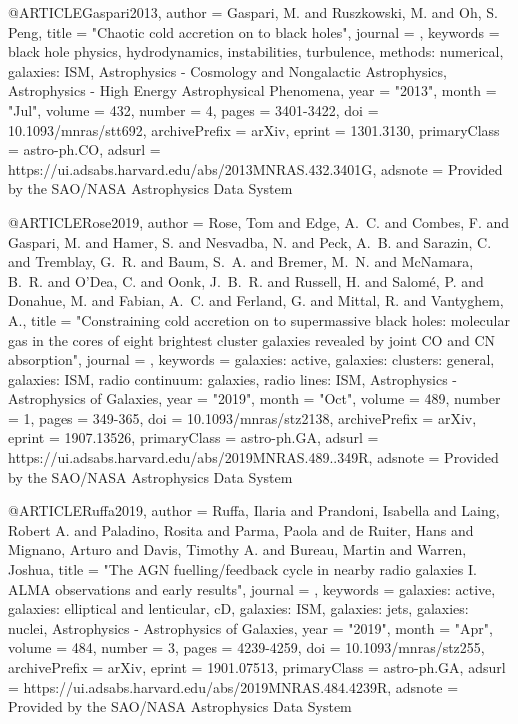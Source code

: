 @ARTICLE{Gaspari2013,
       author = {{Gaspari}, M. and {Ruszkowski}, M. and {Oh}, S. Peng},
        title = "{Chaotic cold accretion on to black holes}",
      journal = {\mnras},
     keywords = {black hole physics, hydrodynamics, instabilities, turbulence, methods: numerical, galaxies: ISM, Astrophysics - Cosmology and Nongalactic Astrophysics, Astrophysics - High Energy Astrophysical Phenomena},
         year = "2013",
        month = "Jul",
       volume = {432},
       number = {4},
        pages = {3401-3422},
          doi = {10.1093/mnras/stt692},
archivePrefix = {arXiv},
       eprint = {1301.3130},
 primaryClass = {astro-ph.CO},
       adsurl = {https://ui.adsabs.harvard.edu/abs/2013MNRAS.432.3401G},
      adsnote = {Provided by the SAO/NASA Astrophysics Data System}
}

@ARTICLE{Rose2019,
       author = {{Rose}, Tom and {Edge}, A.~C. and {Combes}, F. and {Gaspari}, M. and
         {Hamer}, S. and {Nesvadba}, N. and {Peck}, A.~B. and {Sarazin}, C. and
         {Tremblay}, G.~R. and {Baum}, S.~A. and {Bremer}, M.~N. and
         {McNamara}, B.~R. and {O'Dea}, C. and {Oonk}, J.~B.~R. and
         {Russell}, H. and {Salom{\'e}}, P. and {Donahue}, M. and
         {Fabian}, A.~C. and {Ferland}, G. and {Mittal}, R. and {Vantyghem}, A.},
        title = "{Constraining cold accretion on to supermassive black holes: molecular gas in the cores of eight brightest cluster galaxies revealed by joint CO and CN absorption}",
      journal = {\mnras},
     keywords = {galaxies: active, galaxies: clusters: general, galaxies: ISM, radio continuum: galaxies, radio lines: ISM, Astrophysics - Astrophysics of Galaxies},
         year = "2019",
        month = "Oct",
       volume = {489},
       number = {1},
        pages = {349-365},
          doi = {10.1093/mnras/stz2138},
archivePrefix = {arXiv},
       eprint = {1907.13526},
 primaryClass = {astro-ph.GA},
       adsurl = {https://ui.adsabs.harvard.edu/abs/2019MNRAS.489..349R},
      adsnote = {Provided by the SAO/NASA Astrophysics Data System}
}

@ARTICLE{Ruffa2019,
       author = {{Ruffa}, Ilaria and {Prandoni}, Isabella and {Laing}, Robert A. and
         {Paladino}, Rosita and {Parma}, Paola and {de Ruiter}, Hans and
         {Mignano}, Arturo and {Davis}, Timothy A. and {Bureau}, Martin and
         {Warren}, Joshua},
        title = "{The AGN fuelling/feedback cycle in nearby radio galaxies I. ALMA observations and early results}",
      journal = {\mnras},
     keywords = {galaxies: active, galaxies: elliptical and lenticular, cD, galaxies: ISM, galaxies: jets, galaxies: nuclei, Astrophysics - Astrophysics of Galaxies},
         year = "2019",
        month = "Apr",
       volume = {484},
       number = {3},
        pages = {4239-4259},
          doi = {10.1093/mnras/stz255},
archivePrefix = {arXiv},
       eprint = {1901.07513},
 primaryClass = {astro-ph.GA},
       adsurl = {https://ui.adsabs.harvard.edu/abs/2019MNRAS.484.4239R},
      adsnote = {Provided by the SAO/NASA Astrophysics Data System}
}

